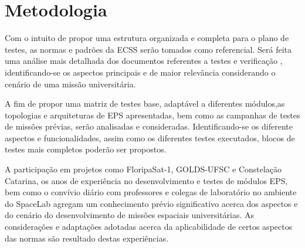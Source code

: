 \chapter{Metodologia}


Com o intuito de propor uma estrutura organizada e completa para o plano de testes, as normas e padrões da \gls{ECSS} serão tomados como referencial.
Será feita uma análise mais detalhada dos documentos referentes a testes \cite{ecss-e-st-10-03} e verificação \cite{ecss-e-st-10-02}, identificando-se os aspectos principais e de maior relevância considerando o cenário de uma missão universitária.

A fim de propor uma matriz de testes base, adaptável a diferentes módulos,as topologias e arquiteturas de \gls{EPS} apresentadas, bem como as campanhas de testes de missões prévias, serão analisadas e consideradas. Identificando-se os diferente aspectos e funcionalidades, assim como os diferentes testes executados, blocos de testes mais completos poderão ser propostos.

A participação em projetos como FloripaSat-1, GOLDS-UFSC e Constelação Catarina, os anos de experiência no desenvolvimento e testes de módulos \gls{EPS}, bem como o convívio diário com professores e colegas de laboratório no ambiente do SpaceLab agregam um conhecimento prévio significativo acerca dos aspectos e do cenário do desenvolvimento de missões espaciais universitárias.
As considerações e adaptações adotadas acerca da aplicabilidade de certos aspectos das normas são resultado destas experiências.